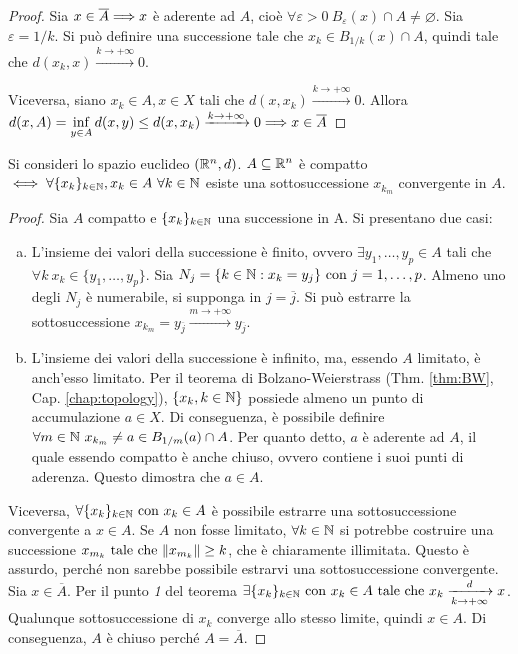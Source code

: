 \begin{proof}
    Sia $x \in \overline{A} \Longrightarrow x$ è aderente ad $A$, cioè $\forall \varepsilon > 0\ B_\varepsilon(x)\cap A \neq \varnothing$. Sia $\varepsilon=1/k$. Si può definire una successione tale che $x_k \in B_{1/k}(x)\cap A$, quindi tale che $d(x_k,x)\xrightarrow{k\to+\infty}0$.
                
    Viceversa, siano $x_k \in A, x \in X$ tali che $d(x,x_k)\xrightarrow{k\to+\infty}0$. Allora $d(x,A)=\inf\limits_{y\in A}d(x,y)\leq d(x,x_k)\xrightarrow{k\to+\infty}0\Longrightarrow x \in \overline{A}$
\end{proof}

\begin{theorem}
    Si consideri lo spazio euclideo $(\mathbb{R}^n,d)$. $A \subseteq \mathbb{R}^n$ è compatto $\iff \forall\{x_k\}_{k\in \mathbb{N}}, x_k \in A \ \forall k \in \mathbb{N}$ esiste una sottosuccessione $x_{k_m}$ convergente in $A$.
\end{theorem}

\begin{proof}
    Sia $A$ compatto e $\{x_k\}_{k\in\mathbb{N}}$ una successione in A. Si presentano due casi:
        \begin{enumerate}[a.]
            \item L'insieme dei valori della successione è finito, ovvero $\exists y_1,\dots,y_p\in A$ tali che $\forall k \ x_k \in \{y_1,\dots,y_p\}$. Sia $N_j=\{k\in\mathbb{N}:x_k=y_j\} \text{ con } j=1,\dots,p$. Almeno uno degli $N_j$ è numerabile, si supponga in $j=\overline{j}$. Si può estrarre la sottosuccessione $x_{k_m}=y_{\overline{j}}\xrightarrow{m\to+\infty}y_{\overline{j}}$.
            \item L'insieme dei valori della successione è infinito, ma, essendo $A$ limitato, è anch'esso limitato. Per il teorema di Bolzano-Weierstrass (Thm. \ref{thm:BW}, Cap. \ref{chap:topology}), $\{x_k, k \in \mathbb{N}\}$ possiede almeno un punto di accumulazione $a \in X$. Di conseguenza, è possibile definire $\forall m \in \mathbb{N}\ x_{k_m}\neq a \in B_{1/m}(a)\cap A$. Per quanto detto, $a$ è aderente ad $A$, il quale essendo compatto è anche chiuso, ovvero contiene i suoi punti di aderenza. Questo dimostra che $a \in A$.
        \end{enumerate}
        
    Viceversa, $\forall \{x_k\}_{k\in\mathbb{N}} \text{ con } x_k \in A$ è possibile estrarre una sottosuccessione convergente a $x \in A$. Se $A$ non fosse limitato, $\forall k \in \mathbb{N}$ si potrebbe costruire una successione $x_{m_k} \text{ tale che } \norm{x_{m_k}}\geq k$, che è chiaramente illimitata. Questo è assurdo, perché non sarebbe possibile estrarvi una sottosuccessione convergente. Sia $x \in \overline{A}$. Per il punto \textit{1} del teorema $\exists \{x_k\}_{k\in\mathbb{N}} \text{ con } x_k \in A \text{ tale che } x_k\xrightarrow[k\to+\infty]{d}x$. Qualunque sottosuccessione di $x_k$ converge allo stesso limite, quindi $x \in A$. Di conseguenza, $A$ è chiuso perché $A=\overline{A}$.
\end{proof}

